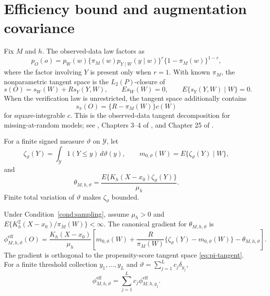 \section{Efficiency bound and augmentation covariance}
\label{sec:supp-efficiency}

Fix \(M\) and \(h\). The observed-data law factors as
\[
p_O(o)
=
p_W(w)
\{\pi_M(w)p_{Y\mid W}(y\mid w)\}^{r}
\{1-\pi_M(w)\}^{1-r},
\]
where the factor involving \(Y\) is present only when \(r=1\). With known \(\pi_M\), the nonparametric tangent space is the \(L_2(P)\)-closure of
\begin{equation}
s(O)=s_W(W)+R s_Y(Y,W),
\qquad
E s_W(W)=0,
\qquad
E\{s_Y(Y,W)\mid W\}=0.
\label{eq:known-pi-tangent}
\end{equation}
When the verification law is unrestricted, the tangent space additionally contains
\begin{equation}
s_\pi(O)=\{R-\pi_M(W)\}c(W)
\label{eq:pi-tangent}
\end{equation}
for square-integrable \(c\). This is the observed-data tangent decomposition for missing-at-random models; see \citet{RobinsRotnitzkyZhao1994}, Chapters 3--4 of \citet{Tsiatis2006}, and Chapter 25 of \citet{VanderVaart1998}.

For a finite signed measure \(\vartheta\) on \(\mathcal Y\), let
\[
\zeta_\vartheta(Y)=\int_{\mathcal Y}1(Y\le y)\,d\vartheta(y),
\qquad
m_{0,\vartheta}(W)=E\{\zeta_\vartheta(Y)\mid W\},
\]
and
\[
\theta_{M,h,\vartheta}
=
\frac{E\{K_h(X-x_0)\zeta_\vartheta(Y)\}}{\mu_h}.
\]
Finite total variation of \(\vartheta\) makes \(\zeta_\vartheta\) bounded.

\begin{theorem}
\label{thm:signed-efficiency}
Under Condition~\ref{cond:sampling}, assume \(\mu_h>0\) and
\(E\{K_h^2(X-x_0)/\pi_M(W)\}<\infty\). The canonical gradient for
\(\theta_{M,h,\vartheta}\) is
\begin{equation}
\phi_{M,h,\vartheta}^{\mathrm{eff}}(O)
=
\frac{K_h(X-x_0)}{\mu_h}
\left[
 m_{0,\vartheta}(W)
 +\frac{R}{\pi_M(W)}\{\zeta_\vartheta(Y)-m_{0,\vartheta}(W)\}
 -\theta_{M,h,\vartheta}
\right].
\label{eq:supp-efficient-if}
\end{equation}
The gradient is orthogonal to the propensity-score tangent space \eqref{eq:pi-tangent}. For a finite threshold collection \(y_1,\ldots,y_L\) and \(\vartheta=\sum_{j=1}^Lc_j\delta_{y_j}\),
\[
\phi_{M,h,\vartheta}^{\mathrm{eff}}
=
\sum_{j=1}^Lc_j\phi_{M,h,y_j}^{\mathrm{eff}}.
\]
\end{theorem}

